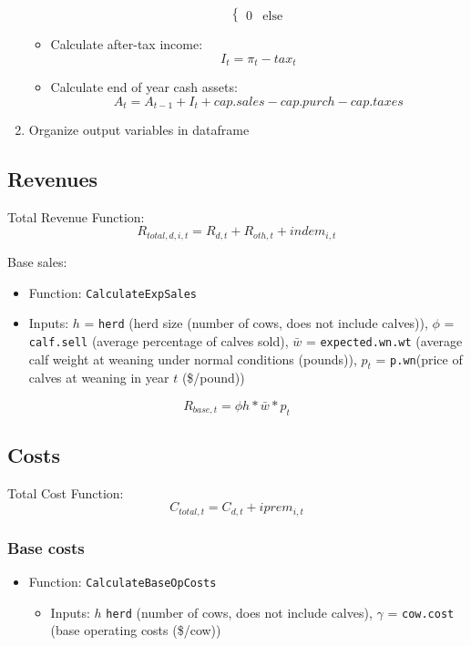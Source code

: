\documentclass[11pt]{article}
\begin{document}
\begin{enumerate}
\begin{itemize}
\begin{equation}
\begin{cases}
	0 & \text{else}
	\end{cases}
	\end{equation}
	\item Calculate after-tax income:
	\begin{equation}
	I_t = \pi_t - tax_t
	\end{equation}
	\item Calculate end of year cash assets:
	\begin{equation}
	A_{t} = A_{t-1} +  I_t + cap.sales - cap.purch - cap.taxes
	\end{equation}
	\end{itemize}
\item  Organize output variables in dataframe
\end{enumerate}

\subsection{Revenues}
Total Revenue Function:
\begin{equation}
R_{total,d,i,t} = R_{d,t} + R_{oth,t} +  indem_{i,t}
\end{equation}

Base sales: 
\begin{itemize}
\item Function: \verb!CalculateExpSales! 
\item Inputs: $h$ = \verb!herd! (herd size (number of cows, does not include calves)), $\phi$ = \verb!calf.sell! (average percentage of calves sold), $\bar{w}$ = \verb!expected.wn.wt! (average calf weight at weaning under normal conditions (pounds)), $p_{t}$ = \verb!p.wn!(price of calves at weaning in year \(t\) (\$/pound))
\end{itemize}

\begin{equation} \label{baserevenues}
R_{base, t} = \phi h * \bar{w} * p_t
\end{equation}


\subsection{Costs}
Total Cost Function:
\begin{equation}
C_{total,t} = C_{d, t} + iprem_{i,t} 
\end{equation}


\subsubsection{Base costs}
\begin{itemize}
\item Function: \verb!CalculateBaseOpCosts!
	\begin{itemize}
	\item Inputs: \(h\) \verb!herd! (number of cows, does not include calves), \(\gamma\) = \verb!cow.cost! (base operating costs (\$/cow))
	\end{itemize}
\end{itemize}
\end{document}
